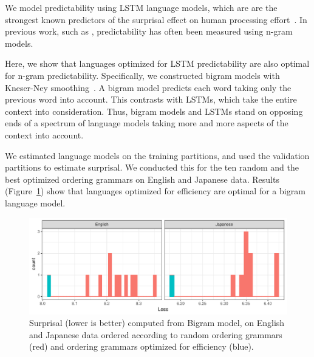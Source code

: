 \documentclass[10pt,twoside,lineno]{article}
\begin{document}
We model predictability using LSTM language models, which are are the strongest known predictors of the surprisal effect on human processing effort~\citep{frank2011insensitivity,goodkind2018predictive}.
In previous work, such as \cite{gildea2015human}, predictability has often been measured using n-gram models.

Here, we show that languages optimized for LSTM predictability are also optimal for n-gram predictability.
Specifically, we constructed bigram models with Kneser-Ney smoothing~\cite{kneser1995improved, chen1999empirical}.
A bigram model predicts each word taking only the previous word into account.
This contrasts with LSTMs, which take the entire context into consideration.
Thus, bigram models and LSTMs stand on opposing ends of a spectrum of language models taking more and more aspects of the context into account.

We estimated language models on the training partitions, and used the validation partitions to estimate surprisal.
We conducted this for the ten random and the best optimized ordering grammars on English and Japanese data.
Results (Figure~\ref{fig:bigrams}) show that languages optimized for efficiency are optimal for a bigram language model.

\begin{figure}
    \centering
    \includegraphics[scale=.6]{../results/bigrams/bigrams.pdf} 
	\caption{Surprisal (lower is better) computed from Bigram model, on English and Japanese data ordered according to random ordering grammars (red) and ordering grammars optimized for efficiency (blue).}
    \label{fig:bigrams}
\end{figure}




%
\end{document}
